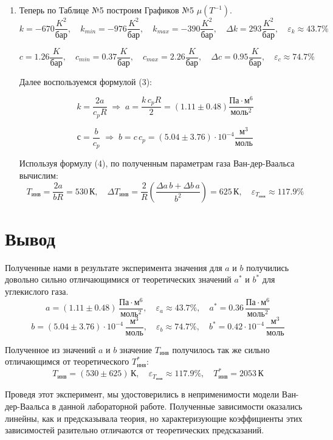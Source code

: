 \documentclass[a4paper,12pt]{article}
\begin{document}
\begin{enumerate}
	
		\item Теперь по Таблице №5 построим Графиков №5 $\mu(T^{-1})$.
		$$k = -670 \frac{K^2}{бар},\quad k_{min} = -976 \frac{K^2}{бар},\quad k_{max} = -390 \frac{K^2}{бар},\quad \Delta k = 293 \frac{K^2}{бар},\quad \varepsilon_{k} \approx 43.7\%$$
		
		$$c = 1.26 \frac{K}{бар},\quad c_{min} = 0.37 \frac{K}{бар},\quad c_{max} = 2.26 \frac{K}{бар},\quad \Delta c = 0.95 \frac{K}{бар},\quad \varepsilon_{c} \approx 74.7\%$$
		
		Далее воспользуемся формулой (3):
		
		$$k = \dfrac{2a}{c_pR} \; \Rightarrow \; a = \dfrac{k \, c_pR}{2} = (1.11\pm0.48) \frac{Па\cdot м^6}{моль^2}$$
		
		$$с = \dfrac{b}{c_p} \; \Rightarrow \; b = c \, c_p = (5.04\pm3.76)\cdot10^{-4} \frac{м^3}{моль}$$
		
		Используя формулу (4), по полученным параметрам газа Ван-дер-Ваальса вычислим: 
		$$T_{инв} = \dfrac{2a}{bR} = 530 \, К, \quad \Delta T_{инв} = \dfrac{2}{R}\left(\dfrac{\Delta a \, b + \Delta b \, a}{b^2}\right) = 625 \, К, \quad \varepsilon_{T_{инв}} \approx 117.9\%$$

\end{enumerate}

\newpage 

\section{Вывод}
	Полученные нами в результате эксперимента значения для $a$ и $b$ получились довольно сильно отличающимися от теоретических значений $a^*$ и $b^*$ для углекислого газа.
	$$a = (1.11\pm0.48) \, \frac{Па\cdot м^6}{моль^2}, \quad \varepsilon_{a} \approx 43.7\%, \quad a^* = 0.36 \, \frac{Па\cdot м^6}{моль^2}$$
	$$b = (5.04\pm3.76)\cdot10^{-4} \, \frac{м^3}{моль}, \quad \varepsilon_{b} \approx 74.7\%, \quad b^* = 0.42\cdot 10^{-4} \, \frac{м^3}{моль}$$
	
	Полученное из значений $a$ и $b$ значение $T_{инв}$ получилось так же сильно отличающимся от теоретического $T_{инв}^*$:
	$$T_{инв} = (530\pm625) \, К, \quad \varepsilon_{T_{инв}} \approx 117.9\%, \quad T_{инв}^* = 2053 \, К$$
	
	Проведя этот эксперимент, мы удостоверились в неприменимости модели Ван-дер-Ваальса в данной лабораторной работе. Полученные зависимости оказались линейны, как и предсказывала теория, но характеризующие коэффициенты этих зависимостей разительно отличаются от теоретических предсказаний. \\
	
\end{document}
